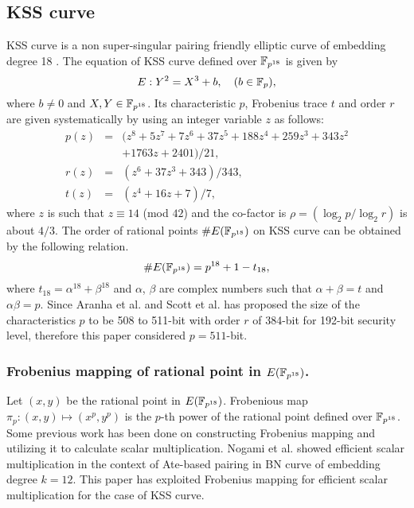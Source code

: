 \subsection{KSS curve}
KSS curve is a non super-singular pairing friendly elliptic curve of embedding degree 18 \cite{EPRINT:KacSchSco07}. The equation of KSS curve defined over $\mathbb{F}_{p^{18}}$ is given by 
\begin{equation}\label{eq:KSS_curve}
E:Y^2=X^3+b, \quad \mbox{($b \in {\mathbb{F}}_{p}$)},
\end{equation}
where $b \neq 0$ and $X,Y \in \mathbb{F}_{p^{18}}$. Its characteristic $p$, Frobenius trace $t$ and order $r$ are given systematically by using an integer variable $z$ as follows:
\begin{subequations}
\begin{eqnarray}
p(z) &= & (z^8 +5z^7 +7z^6 +37z^5 +188z^4 +259z^3 +343z^2  \nonumber \\ 								
& & +1763z+2401)/21,\\\label{eq:kss_char}
r(z) &= &(z^6 + 37z^3 + 343)/343,\label{eq:kss_degree}  \\
t(z) &=& (z^4 + 16z + 7)/7, \label{eq:kss_trace} 
\end{eqnarray}
\end{subequations} 
where $z$ is such that $z \equiv 14$ (mod $42$) and the co-factor is $\rho = (\log_2 p/\log_2 r)$ is about $4/3$.
The order of rational points $\#E(\mathbb{F}_{p^{18}})$ on KSS curve can be obtained by the following relation.
\begin{equation}\label{eq:order_relation}
\#E(\mathbb{F}_{p^{18}}) = p^{18}+1-t_{18},
\end{equation}
where $t_{18} = \alpha^{18}+\beta^{18}$ and $\alpha$, $\beta$ are complex numbers such that $\alpha+\beta = t$ and $\alpha\beta=p$.
Since Aranha et al. \cite{PAIRING:AFKMR12} and Scott et al. \cite{IMA:Scott11} has proposed the size of the characteristics $p$ to be 508 to 511-bit with order $r$ of 384-bit  for 192-bit security level, therefore this paper considered $p=511$-bit.

\subsubsection{Frobenius mapping of rational point in  $E(\mathbb{F}_{p^{18}})$.}
Let $(x,y)$ be the rational point in $E(\mathbb{F}_{p^{18}})$. 
Frobenious map $\pi_p : (x,y) \mapsto  (x^p,y^p)$ is the $p$-th power of the rational point defined over $\mathbb{F}_{p^{18}}$. Some previous work \cite{fm_previous} has been done on constructing Frobenius mapping and utilizing it to calculate scalar multiplication. Nogami et al. \cite{DBLP:journals/ieicet/NogamiSONAM09} showed efficient scalar multiplication in the context of Ate-based pairing in BN curve of embedding degree $k=12$.  This paper has exploited Frobenius mapping for efficient scalar multiplication for the case of KSS curve.


